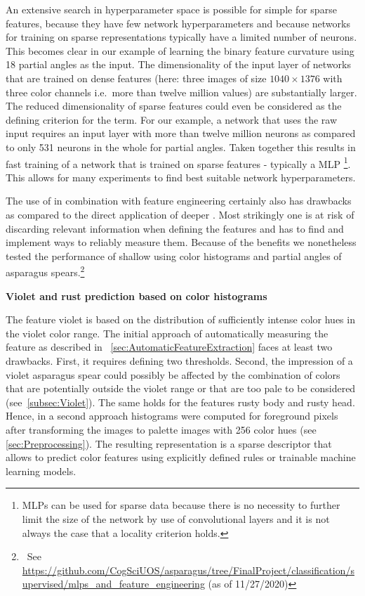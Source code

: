 An extensive search in hyperparameter space is possible for simple  for sparse features, because they have few network hyperparameters and because networks for training on sparse representations typically have a limited number of neurons. This becomes clear in our example of learning the binary feature curvature using 18 partial angles as the input. The dimensionality of the input layer of networks that are trained on dense features (here: three images of size $1040\times1376$ with three color channels i.e.\ more than twelve million values) are substantially larger. The reduced dimensionality of sparse features could even be considered as the defining criterion for the term. For our example, a network that uses the raw input requires an input layer with more than twelve million neurons as compared to only 531 neurons in the whole   for partial angles. Taken together this results in fast training of a network that is trained on sparse features - typically a MLP \footnote{MLPs can be used for sparse data because there is no necessity to further limit the size of  the network by use of convolutional layers and it is not always the case that a locality criterion holds.}. This allows for many experiments to find best suitable network hyperparameters. 

The use of  in combination with feature engineering certainly also has drawbacks as compared to the direct application of deeper  . Most strikingly one is at risk of discarding relevant information when defining the features and has to find and implement ways to reliably measure them. Because of the benefits we nonetheless tested the performance of shallow  using color histograms and partial angles of asparagus spears.\footnote{~See \url{https://github.com/CogSciUOS/asparagus/tree/FinalProject/classification/supervised/mlps\_and\_feature\_engineering} (as of 11/27/2020)}

\bigskip
\textbf{Violet and rust prediction based on color histograms} 

The feature violet is based on the distribution of sufficiently intense color hues in the violet color range. The initial approach of automatically measuring the feature as described in ~\autoref{sec:AutomaticFeatureExtraction} faces at least two drawbacks. First, it requires defining two thresholds. Second, the impression of a violet asparagus spear could possibly be affected by the combination of colors that are potentially outside the violet range or that are too pale to be considered (see~\autoref{subsec:Violet}). The same holds for the features rusty body and rusty head. Hence, in a second approach histograms were computed for foreground pixels after transforming the images to palette images with 256 color hues (see \autoref{sec:Preprocessing}). The resulting representation is a sparse descriptor that allows to predict color features using explicitly defined rules or trainable machine learning models.

